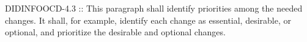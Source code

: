 
DIDINFO{OCD-4.3 :: This paragraph shall identify priorities among the needed changes. 
It shall, for example, identify each change as essential, desirable, or optional, and prioritize the desirable and optional changes.}